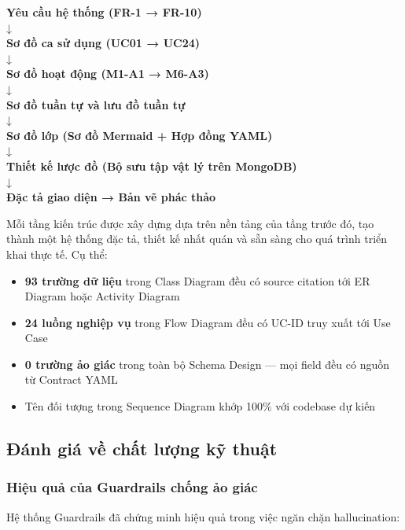 \documentclass[13pt,a4paper,oneside]{extreport}
\numberwithin{equation}{chapter}
\numberwithin{figure}{chapter}
\numberwithin{table}{chapter}
\begin{document}
\begin{center}
\textbf{Yêu cầu hệ thống (FR-1 → FR-10)} \\
↓ \\
\textbf{Sơ đồ ca sử dụng (UC01 → UC24)} \\
↓ \\
\textbf{Sơ đồ hoạt động (M1-A1 → M6-A3)} \\
↓ \\
\textbf{Sơ đồ tuần tự và lưu đồ tuần tự} \\
↓ \\
\textbf{Sơ đồ lớp (Sơ đồ Mermaid + Hợp đồng YAML)} \\
↓ \\
\textbf{Thiết kế lược đồ (Bộ sưu tập vật lý trên MongoDB)} \\
↓ \\
\textbf{Đặc tả giao diện → Bản vẽ phác thảo}
\end{center}

Mỗi tầng kiến trúc được xây dựng dựa trên nền tảng của tầng trước đó, tạo thành một hệ thống đặc tả, thiết kế nhất quán và sẵn sàng cho quá trình triển khai thực tế. Cụ thể:

\begin{itemize}
    \item \textbf{93 trường dữ liệu} trong Class Diagram đều có source citation tới ER Diagram hoặc Activity Diagram
    \item \textbf{24 luồng nghiệp vụ} trong Flow Diagram đều có UC-ID truy xuất tới Use Case
    \item \textbf{0 trường ảo giác} trong toàn bộ Schema Design — mọi field đều có nguồn từ Contract YAML
    \item Tên đối tượng trong Sequence Diagram khớp 100\% với codebase dự kiến
\end{itemize}

\subsection{Đánh giá về chất lượng kỹ thuật}

\subsubsection{Hiệu quả của Guardrails chống ảo giác}

Hệ thống Guardrails đã chứng minh hiệu quả trong việc ngăn chặn hallucination:
\end{document}
